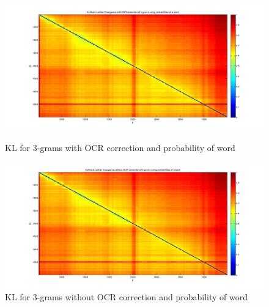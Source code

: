 \begin{figure}[h!]
    \begin{minipage}[b]{0.48\linewidth}
        \includegraphics[scale=0.15]{Pictures/kullback-leibler/KL_3-grams_with_correction_proba.jpg}
        \caption{KL for 3-grams with OCR correction and probability of word}
        \label{KL-PC3}
    \end{minipage}\hfill
    \begin{minipage}[b]{0.5\linewidth}
        \includegraphics[scale=0.15]{Pictures/kullback-leibler/KL_3-grams_without_correction_proba.jpg}
        \caption{KL for 3-grams without OCR correction and probability of word}
        \label{KL-PN3}
    \end{minipage}\hfill
\end{figure}

